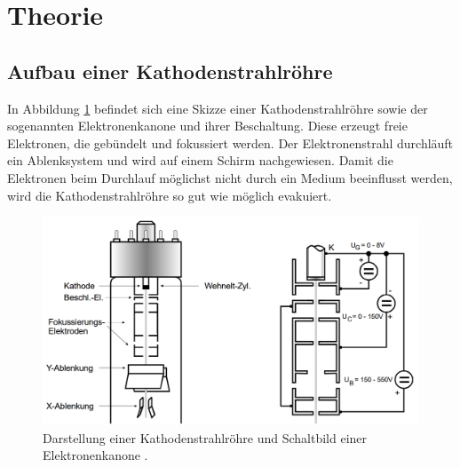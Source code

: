 \section{Theorie}
\label{sec:Theorie}
\subsection{Aufbau einer Kathodenstrahlröhre}
\label{subsec:Kathodenstrahlröhre}

In Abbildung \ref{fig:kathode} befindet sich eine Skizze einer Kathodenstrahlröhre sowie der
sogenannten Elektronenkanone und ihrer Beschaltung. Diese erzeugt freie Elektronen, die gebündelt und
fokussiert werden. Der Elektronenstrahl durchläuft ein Ablenksystem und wird auf einem
Schirm nachgewiesen. Damit die Elektronen beim Durchlauf möglichst nicht durch
ein Medium beeinflusst werden, wird die Kathodenstrahlröhre so gut wie möglich evakuiert.

\begin{figure}[H]
  \centering
  \includegraphics[width=400pt]{data/kathodenstrahlroehre.png}
  \caption{Darstellung einer Kathodenstrahlröhre und Schaltbild einer Elektronenkanone \cite{Versuchsanleitung501}.}
  \label{fig:kathode}
\end{figure}

